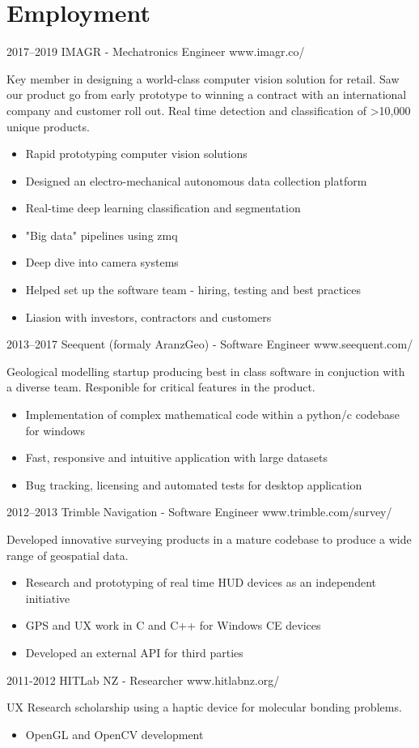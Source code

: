 \documentclass[print]{friggeri-cv} %
\begin{document}
\section{Employment}
\begin{entrylist}
\entry
{2017--2019}
{IMAGR - Mechatronics Engineer}
{www.imagr.co/}
{Key member in designing a world-class computer vision solution for retail. Saw our product go from early prototype to winning a contract with an international company and customer roll out. Real time detection and classification of >10,000 unique products.
\begin{itemize}
\item Rapid prototyping computer vision solutions
\item Designed an electro-mechanical autonomous data collection platform
\item Real-time deep learning classification and segmentation
\item "Big data" pipelines using zmq
\item Deep dive into camera systems
\item Helped set up the software team - hiring, testing and best practices
\item Liasion with investors, contractors and customers
\end{itemize}}

\entry
{2013--2017}
{Seequent (formaly AranzGeo) - Software Engineer}
{www.seequent.com/}
{Geological modelling startup producing best in class software in conjuction with a diverse team. Responible for critical features in the product.
\begin{itemize}
\item Implementation of complex mathematical code within a python/c codebase for windows
\item Fast, responsive and intuitive application with large datasets
\item Bug tracking, licensing and automated tests for desktop application
\end{itemize}}

\entry
{2012--2013}
{Trimble Navigation - Software Engineer}
{www.trimble.com/survey/}
{Developed innovative surveying products in a mature codebase to produce a wide range of geospatial data.
\begin{itemize}
\item Research and prototyping of real time HUD devices as an independent initiative
\item GPS and UX work in C and C++ for Windows CE devices
\item Developed an external API for third parties
\end{itemize}}

\entry
{2011-2012}
{HITLab NZ - Researcher}
{www.hitlabnz.org/}
{UX Research scholarship using a haptic device for molecular bonding problems.
\begin{itemize}
\item OpenGL and OpenCV development
\end{itemize}}
\end{entrylist}\\ 
\end{document}
